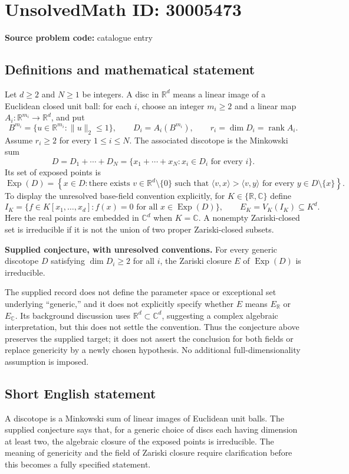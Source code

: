 \documentclass[11pt]{article}
\newcommand{\R}{\mathbb{R}}
\newcommand{\C}{\mathbb{C}}
\begin{document}
\section*{UnsolvedMath ID: 30005473}
\textbf{Source problem code:} catalogue entry
\subsection{Definitions and mathematical statement}
Let \(d\geq 2\) and \(N\geq 1\) be integers. A disc in \(\R^d\) means a linear image of a Euclidean closed unit ball: for each \(i\), choose an integer \(m_i\geq 2\) and a linear map \(A_i:\R^{m_i}\to\R^d\), and put
\[
B^{m_i}=\{u\in\R^{m_i}:\|u\|_2\leq 1\},\qquad D_i=A_i(B^{m_i}),\qquad r_i=\dim D_i=\operatorname{rank}A_i.
\]
Assume \(r_i\geq 2\) for every \(1\leq i\leq N\). The associated discotope is the Minkowski sum
\[
D=D_1+\cdots+D_N=\{x_1+\cdots+x_N:x_i\in D_i\text{ for every }i\}.
\]
Its set of exposed points is
\[
\operatorname{Exp}(D)=\left\{x\in D:\text{there exists }v\in\R^d\setminus\{0\}\text{ such that }\langle v,x\rangle>\langle v,y\rangle\text{ for every }y\in D\setminus\{x\}\right\}.
\]
To display the unresolved base-field convention explicitly, for \(K\in\{\R,\C\}\) define
\[
I_K=\{f\in K[x_1,\ldots,x_d]:f(x)=0\text{ for all }x\in\operatorname{Exp}(D)\},\qquad E_K=V_K(I_K)\subseteq K^d.
\]
Here the real points are embedded in \(\C^d\) when \(K=\C\). A nonempty Zariski-closed set is irreducible if it is not the union of two proper Zariski-closed subsets.

\textbf{Supplied conjecture, with unresolved conventions.} For every generic discotope \(D\) satisfying \(\dim D_i\geq 2\) for all \(i\), the Zariski closure \(E\) of \(\operatorname{Exp}(D)\) is irreducible.

The supplied record does not define the parameter space or exceptional set underlying ``generic,'' and it does not explicitly specify whether \(E\) means \(E_{\R}\) or \(E_{\C}\). Its background discussion uses \(\R^d\subset\C^d\), suggesting a complex algebraic interpretation, but this does not settle the convention. Thus the conjecture above preserves the supplied target; it does not assert the conclusion for both fields or replace genericity by a newly chosen hypothesis. No additional full-dimensionality assumption is imposed.
\subsection{Short English statement}
A discotope is a Minkowski sum of linear images of Euclidean unit balls. The supplied conjecture says that, for a generic choice of discs each having dimension at least two, the algebraic closure of the exposed points is irreducible. The meaning of genericity and the field of Zariski closure require clarification before this becomes a fully specified statement.
\end{document}

